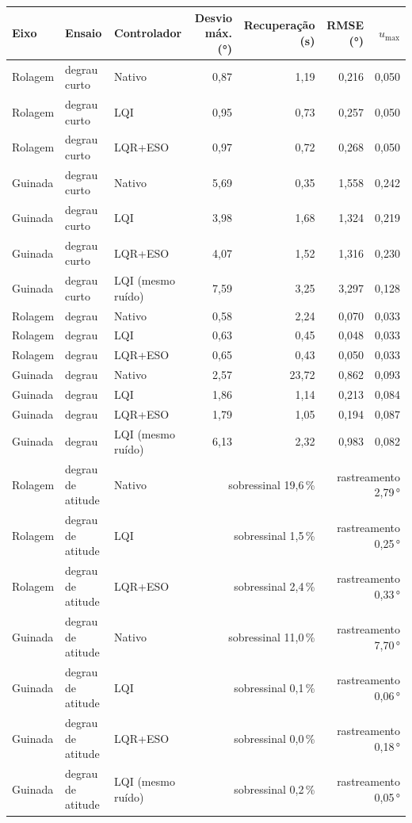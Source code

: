 \begin{tabular}{lllrrrr}
\toprule
Eixo & Ensaio & Controlador & Desvio máx. (\si{\degree}) & Recuperação (\si{\second}) & RMSE (\si{\degree}) & $u_{\max}$ \\
\midrule
Rolagem & degrau curto & Nativo & 0,87 & 1,19 & 0,216 & 0,050 \\
Rolagem & degrau curto & LQI & 0,95 & 0,73 & 0,257 & 0,050 \\
Rolagem & degrau curto & LQR+ESO & 0,97 & 0,72 & 0,268 & 0,050 \\
Guinada & degrau curto & Nativo & 5,69 & 0,35 & 1,558 & 0,242 \\
Guinada & degrau curto & LQI & 3,98 & 1,68 & 1,324 & 0,219 \\
Guinada & degrau curto & LQR+ESO & 4,07 & 1,52 & 1,316 & 0,230 \\
Guinada & degrau curto & LQI (mesmo ruído) & 7,59 & 3,25 & 3,297 & 0,128 \\
\addlinespace
Rolagem & degrau & Nativo & 0,58 & 2,24 & 0,070 & 0,033 \\
Rolagem & degrau & LQI & 0,63 & 0,45 & 0,048 & 0,033 \\
Rolagem & degrau & LQR+ESO & 0,65 & 0,43 & 0,050 & 0,033 \\
Guinada & degrau & Nativo & 2,57 & 23,72 & 0,862 & 0,093 \\
Guinada & degrau & LQI & 1,86 & 1,14 & 0,213 & 0,084 \\
Guinada & degrau & LQR+ESO & 1,79 & 1,05 & 0,194 & 0,087 \\
Guinada & degrau & LQI (mesmo ruído) & 6,13 & 2,32 & 0,983 & 0,082 \\
\addlinespace
Rolagem & degrau de atitude & Nativo & \multicolumn{2}{r}{sobressinal 19,6\,\%} & \multicolumn{2}{r}{rastreamento 2,79\,\si{\degree}} \\
Rolagem & degrau de atitude & LQI & \multicolumn{2}{r}{sobressinal 1,5\,\%} & \multicolumn{2}{r}{rastreamento 0,25\,\si{\degree}} \\
Rolagem & degrau de atitude & LQR+ESO & \multicolumn{2}{r}{sobressinal 2,4\,\%} & \multicolumn{2}{r}{rastreamento 0,33\,\si{\degree}} \\
Guinada & degrau de atitude & Nativo & \multicolumn{2}{r}{sobressinal 11,0\,\%} & \multicolumn{2}{r}{rastreamento 7,70\,\si{\degree}} \\
Guinada & degrau de atitude & LQI & \multicolumn{2}{r}{sobressinal 0,1\,\%} & \multicolumn{2}{r}{rastreamento 0,06\,\si{\degree}} \\
Guinada & degrau de atitude & LQR+ESO & \multicolumn{2}{r}{sobressinal 0,0\,\%} & \multicolumn{2}{r}{rastreamento 0,18\,\si{\degree}} \\
Guinada & degrau de atitude & LQI (mesmo ruído) & \multicolumn{2}{r}{sobressinal 0,2\,\%} & \multicolumn{2}{r}{rastreamento 0,05\,\si{\degree}} \\
\bottomrule
\end{tabular}
